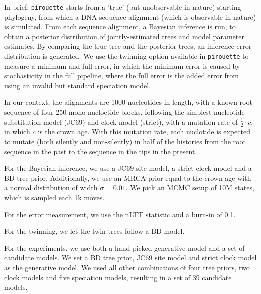 In brief: \verb;pirouette; starts from a 'true' (but 
unobservable in nature) starting phylogeny,
from which a DNA sequence alignment (which is observable 
in nature) is simulated. 
From each sequence alignment, a Bayesian inference is run, 
to obtain a posterior distribution of jointly-estimated 
trees and model parameter estimates.
By comparing the true tree and the posterior trees,
an inference error distribution is generated. 
We use the twinning option available in \verb;pirouette;
to measure a minimum and full error, in which
the minimum error is caused
by stochasticity in the full pipeline, where the full error
is the added error from using an invalid but standard speciation model.

In our context, the alignments are 1000 nucleotides in length,
with a known root sequence of four 250 mono-nucloetide blocks,
following the simplest nucleotide substitution model (JC69)
and clock model (strict), with a mutation rate of $\frac{1}{2}\cdot c$, 
in which $c$ is the crown age. With this mutation rate, each nuclotide is
expected to mutate (both silently and non-silently) 
in half of the histories from the root sequence in the past 
to the sequence in the tips in the present.

For the Bayesian inference, we use a JC69 site model, a strict
clock model and a BD tree prior. Additionally, we use 
an MRCA prior equal to the crown age with a normal distribution 
of width $\sigma = 0.01$. We pick an MCMC setup of 10M states,
which is sampled each 1k moves.

For the error measurement, we use the nLTT statistic and
a burn-in of 0.1.

For the twinning, we let the twin trees follow a BD model.

For the experiments, we use both a hand-picked generative model
and a set of candidate models. We set a BD tree prior, JC69 site
model and strict clock model as the generative model. We used
all other combinations of four tree priors, two clock models and
five speciation models, resulting in a set of 39 candidate models.
